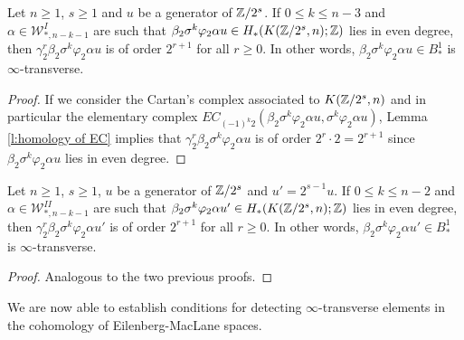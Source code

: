 \begin{lem}\label{l:transversity 2}
Let $n\geq1$, $s\geq1$ and $u$ be a generator of $\mathbb{Z}/2^s$. If $0\leq k\leq n-3$ and $\alpha\in{\mathcal W}^{I}_{*,n-k-1}$ are such that $\beta_2\sigma^k\varphi_2\alpha u\in H_*(K(\mathbb{Z}/2^s,n);\mathbb{Z})$ lies in even degree, then $\gamma_2^r\beta_2\sigma^k\varphi_2\alpha u$ is of order $2^{r+1}$ for all $r\geq0$. In other words, $\beta_2\sigma^k\varphi_2\alpha u\in B_*^1$ is $\infty$-transverse.
\end{lem}

\begin{proof}
If we consider the Cartan's complex associated to $K(\mathbb{Z}/2^s,n)$ and in particular the elementary complex $EC_{(-1)^k 2}(\beta_2\sigma^k\varphi_2\alpha u,\sigma^k\varphi_2\alpha u)$, Lemma \ref{l:homology of EC} implies that $\gamma_2^r\beta_2\sigma^k\varphi_2\alpha u$ is of order $2^r\cdot2=2^{r+1}$ since $\beta_2\sigma^k\varphi_2\alpha u$ lies in even degree.
\end{proof}

\begin{lem}\label{l:transversity 3}
Let $n\geq1$, $s\geq1$, $u$ be a generator of $\mathbb{Z}/2^s$ and $u'=2^{s-1}u$. If $0\leq k\leq n-2$ and $\alpha\in{\mathcal W}^{II}_{*,n-k-1}$ are such that $\beta_2\sigma^k\varphi_2\alpha u'\in H_*(K(\mathbb{Z}/2^s,n);\mathbb{Z})$ lies in even degree, then $\gamma_2^r\beta_2\sigma^k\varphi_2\alpha u'$ is of order $2^{r+1}$ for all $r\geq0$. In other words, $\beta_2\sigma^k\varphi_2\alpha u'\in B_*^1$ is $\infty$-transverse.
\end{lem}

\begin{proof}
Analogous to the two previous proofs.
\end{proof}

We are now able to establish conditions for detecting $\infty$-transverse elements in the cohomology of Eilenberg-MacLane spaces.

\begin{thm_main_technical}

\end{thm_main_technical}

